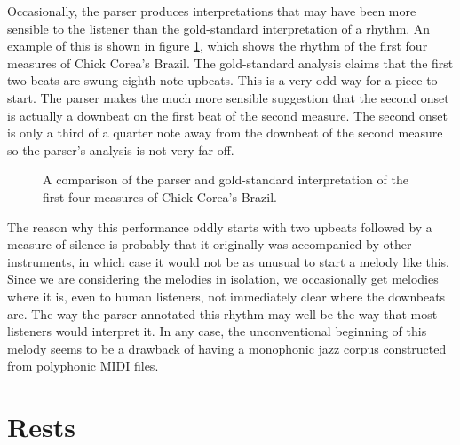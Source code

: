 Occasionally, the parser produces interpretations that may have been more sensible to the listener than the gold-standard interpretation of a rhythm. An example of this is shown in figure \ref{fig:brazil}, which shows the rhythm of the first four measures of Chick Corea's Brazil. The gold-standard analysis claims that the first two beats are swung eighth-note upbeats. This is a very odd way for a piece to start. The parser makes the much more sensible suggestion that the second onset is actually a downbeat on the first beat of the second measure. The second onset is only a third of a quarter note away from the downbeat of the second measure so the parser's analysis is not very far off. 

\begin{figure}
\centering
{}

\caption{A comparison of the parser and gold-standard interpretation of the first four measures of Chick Corea's Brazil.}
\label{fig:brazil}
\end{figure}

The reason why this performance oddly starts with two upbeats followed by a measure of silence is probably that it originally was accompanied by other instruments, in which case it would not be as unusual to start a melody like this. Since we are considering the melodies in isolation, we occasionally get melodies where it is, even to human listeners, not immediately clear where the downbeats are. The way the parser annotated this rhythm may well be the way that most listeners would interpret it. In any case, the unconventional beginning of this melody seems to be a drawback of having a monophonic jazz corpus constructed from polyphonic MIDI files.

\section{Rests}

